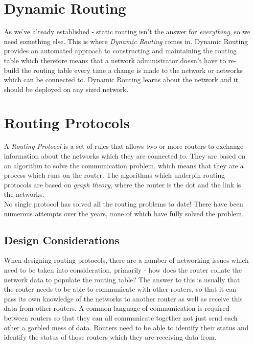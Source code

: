 \section{Dynamic Routing}
As we've already established - static routing isn't the answer for \textit{everything}, so we need something else. This is where \textit{Dynamic Routing} comes in. Dynamic Routing provides an automated approach to constructing and maintaining the routing table which therefore means that a network administrator doesn't have to re-build the routing table every time a change is made to the network or networks which can be connected to. Dynamic Routing learns about the network and it should be deployed on any sized network.

\section{Routing Protocols}
A \textit{Routing Protocol} is a set of rules that allows two or more routers to exchange information about the networks which they are connected to. They are based on an algorithm to solve the communication problem, which means that they are a process which runs on the router. The algorithms which underpin routing protocols are based on \textit{graph theory}, where the router is the dot and the link is the networks.\\

No single protocol has solved all the routing problems to date! There have been numerous attempts over the years, none of which have fully solved the problem.

\subsection{Design Considerations}
When designing routing protocols, there are a number of networking issues which need to be taken into consideration, primarily - how does the router collate the network data to populate the routing table? The answer to this is usually that the router needs to be able to communicate with other routers, so that it can pass its own knowledge of the networks to another router as well as receive this data from other routers. A common language of communication is required between routers so that they can all communicate together not just send each other a garbled mess of data. Routers need to be able to identify their status and identify the status of those routers which they are receiving data from.\\

